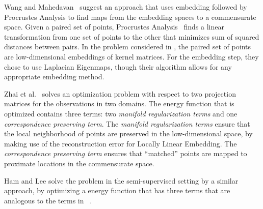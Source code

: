 \documentclass[12pt]{article} %
\begin{document}
Wang and Mahedavan~\cite{Wang2008} suggest an  approach that uses embedding followed by Procrustes Analysis to find maps from the embedding spaces to a commensurate space. Given a paired set of points, Procrustes Analysis~\cite{Sibson}  finds a linear transformation from one set of points to the other that minimizes sum of squared distances between pairs. In the problem considered in \cite{Wang2008}, the paired set of points are low-dimensional embeddings of kernel matrices. For the embedding step, they chose to use Laplacian Eigenmaps, though their algorithm allows for any appropriate embedding method.

 Zhai et al.~\cite{Zhai2010}  solves an optimization problem  with respect to  two projection matrices for the observations in two domains.  The energy function that is optimized contains three terms: two \emph{manifold regularization terms} and one \emph{correspondence preserving term}. The  \emph{manifold regularization terms} ensure that the local neighborhood of points are preserved in the low-dimensional space, by making use of the reconstruction error for Locally Linear Embedding\cite{Roweis_LLE}.
The \emph{correspondence preserving term} ensures that ``matched'' points are mapped to proximate locations in the commensurate space.

Ham and Lee \cite{Ham2005a} solve the problem in the semi-supervised setting by a similar approach, by optimizing a energy function that has three terms that are analogous to the terms in ~\cite{Zhai2010}.
\end{document}
